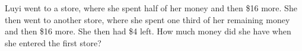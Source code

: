 Luyi went to a store, where she spent half of her money and then \$16 more. She then went to another store, where she spent one third of her remaining money and then \$16 more. She then had \$4 left. How much money did she have when she entered the first store?
